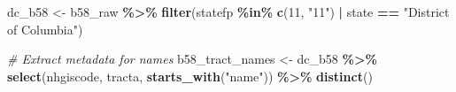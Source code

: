 \documentclass[
]{article}
\newenvironment{Shaded}{\begin{snugshade}}{\end{snugshade}}
\newcommand{\CommentTok}[1]{\textcolor[rgb]{0.56,0.35,0.01}{\textit{#1}}}
\newcommand{\DecValTok}[1]{\textcolor[rgb]{0.00,0.00,0.81}{#1}}
\newcommand{\FunctionTok}[1]{\textcolor[rgb]{0.13,0.29,0.53}{\textbf{#1}}}
\newcommand{\NormalTok}[1]{#1}
\newcommand{\OtherTok}[1]{\textcolor[rgb]{0.56,0.35,0.01}{#1}}
\newcommand{\SpecialCharTok}[1]{\textcolor[rgb]{0.81,0.36,0.00}{\textbf{#1}}}
\newcommand{\StringTok}[1]{\textcolor[rgb]{0.31,0.60,0.02}{#1}}
\begin{document}
\begin{Shaded}
\begin{Highlighting}[]
\NormalTok{dc\_b58 }\OtherTok{\textless{}{-}}\NormalTok{ b58\_raw }\SpecialCharTok{\%\textgreater{}\%}
  \FunctionTok{filter}\NormalTok{(statefp }\SpecialCharTok{\%in\%} \FunctionTok{c}\NormalTok{(}\DecValTok{11}\NormalTok{, }\StringTok{"11"}\NormalTok{) }\SpecialCharTok{|}\NormalTok{ state }\SpecialCharTok{==} \StringTok{"District of Columbia"}\NormalTok{)}

\CommentTok{\# Extract metadata for names}
\NormalTok{b58\_tract\_names }\OtherTok{\textless{}{-}}\NormalTok{ dc\_b58 }\SpecialCharTok{\%\textgreater{}\%}
  \FunctionTok{select}\NormalTok{(nhgiscode, tracta, }\FunctionTok{starts\_with}\NormalTok{(}\StringTok{"name"}\NormalTok{)) }\SpecialCharTok{\%\textgreater{}\%}
  \FunctionTok{distinct}\NormalTok{()}


\end{Highlighting}
\end{Shaded}
\end{document}
